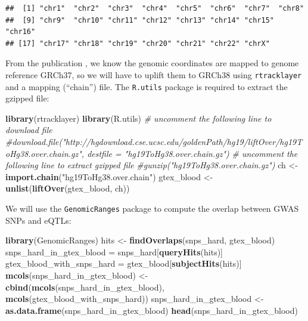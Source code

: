\documentclass[9pt,a4paper,]{extarticle}
\newenvironment{Shaded}{\begin{snugshade}}{\end{snugshade}}
\newcommand{\KeywordTok}[1]{\textcolor[rgb]{0.13,0.29,0.53}{\textbf{#1}}}
\newcommand{\StringTok}[1]{\textcolor[rgb]{0.31,0.60,0.02}{#1}}
\newcommand{\CommentTok}[1]{\textcolor[rgb]{0.56,0.35,0.01}{\textit{#1}}}
\newcommand{\NormalTok}[1]{#1}
\begin{document}
\begin{verbatim}
##  [1] "chr1"  "chr2"  "chr3"  "chr4"  "chr5"  "chr6"  "chr7"  "chr8" 
##  [9] "chr9"  "chr10" "chr11" "chr12" "chr13" "chr14" "chr15" "chr16"
## [17] "chr17" "chr18" "chr19" "chr20" "chr21" "chr22" "chrX"
\end{verbatim}

From the publication \citep{GTEx2017a}, we know the genomic coordinates are mapped to genome reference GRCh37, so we will have to uplift them to GRCh38 using \texttt{rtracklayer} \citep{Lawrence2009} and a mapping (``chain'') file.
The \texttt{R.utils} package \citep{Bengtsson2017} is required to extract the gzipped file:

\begin{Shaded}
\begin{Highlighting}[]
\KeywordTok{library}\NormalTok{(rtracklayer)}
\KeywordTok{library}\NormalTok{(R.utils)}
\CommentTok{# uncomment the following line to download file}
\CommentTok{#download.file("http://hgdownload.cse.ucsc.edu/goldenPath/hg19/liftOver/hg19ToHg38.over.chain.gz", destfile = "hg19ToHg38.over.chain.gz")}
\CommentTok{# uncomment the following line to extract gzipped file}
\CommentTok{#gunzip("hg19ToHg38.over.chain.gz")}
\NormalTok{ch <-}\StringTok{ }\KeywordTok{import.chain}\NormalTok{(}\StringTok{"hg19ToHg38.over.chain"}\NormalTok{)}
\NormalTok{gtex_blood <-}\StringTok{ }\KeywordTok{unlist}\NormalTok{(}\KeywordTok{liftOver}\NormalTok{(gtex_blood, ch))}
\end{Highlighting}
\end{Shaded}

We will use the \texttt{GenomicRanges} package \citep{Lawrence2013} to compute the overlap between GWAS SNPs and eQTLs:

\begin{Shaded}
\begin{Highlighting}[]
\KeywordTok{library}\NormalTok{(GenomicRanges)}
\NormalTok{hits <-}\StringTok{ }\KeywordTok{findOverlaps}\NormalTok{(snps_hard, gtex_blood)}
\NormalTok{snps_hard_in_gtex_blood =}\StringTok{ }\NormalTok{snps_hard[}\KeywordTok{queryHits}\NormalTok{(hits)]}
\NormalTok{gtex_blood_with_snps_hard =}\StringTok{ }\NormalTok{gtex_blood[}\KeywordTok{subjectHits}\NormalTok{(hits)]}
\KeywordTok{mcols}\NormalTok{(snps_hard_in_gtex_blood) <-}\StringTok{ }\KeywordTok{cbind}\NormalTok{(}\KeywordTok{mcols}\NormalTok{(snps_hard_in_gtex_blood), }\KeywordTok{mcols}\NormalTok{(gtex_blood_with_snps_hard))}
\NormalTok{snps_hard_in_gtex_blood <-}\StringTok{ }\KeywordTok{as.data.frame}\NormalTok{(snps_hard_in_gtex_blood)}
\KeywordTok{head}\NormalTok{(snps_hard_in_gtex_blood)}
\end{Highlighting}
\end{Shaded}
\end{document}
